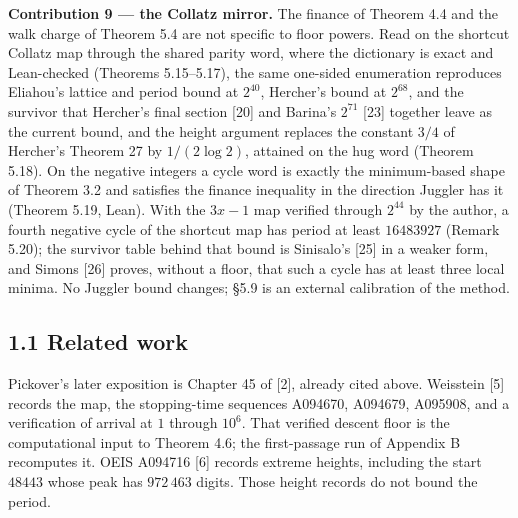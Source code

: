 \documentclass[12pt]{article}
\begin{document}
\textbf{Contribution 9 --- the Collatz mirror.} The finance of Theorem
4.4 and the walk charge of Theorem 5.4 are not specific to floor powers.
Read on the shortcut Collatz map through the shared parity word, where
the dictionary is exact and Lean-checked (Theorems 5.15--5.17), the same
one-sided enumeration reproduces Eliahou's lattice and period bound at
\(2^{40}\), Hercher's bound at \(2^{68}\), and the survivor that
Hercher's final section {[}20{]} and Barina's \(2^{71}\) {[}23{]}
together leave as the current bound, and the height argument replaces
the constant \(3/4\) of Hercher's Theorem 27 by \(1/(2\log2)\), attained
on the hug word (Theorem 5.18). On the negative integers a cycle word is
exactly the minimum-based shape of Theorem 3.2 and satisfies the finance
inequality in the direction Juggler has it (Theorem 5.19, Lean). With
the \(3x-1\) map verified through \(2^{44}\) by the author, a fourth
negative cycle of the shortcut map has period at least \(16483927\)
(Remark 5.20); the survivor table behind that bound is Sinisalo's
{[}25{]} in a weaker form, and Simons {[}26{]} proves, without a floor,
that such a cycle has at least three local minima. No Juggler bound
changes; §5.9 is an external calibration of the method.

\subsection{1.1 Related work}\label{related-work}

Pickover's later exposition is Chapter 45 of {[}2{]}, already cited
above. Weisstein {[}5{]} records the map, the stopping-time sequences
A094670, A094679, A095908, and a verification of arrival at \(1\)
through \(10^6\). That verified descent floor is the computational input
to Theorem 4.6; the first-passage run of Appendix B recomputes it. OEIS
A094716 {[}6{]} records extreme heights, including the start \(48443\)
whose peak has \(972\,463\) digits. Those height records do not bound
the period.
\end{document}

